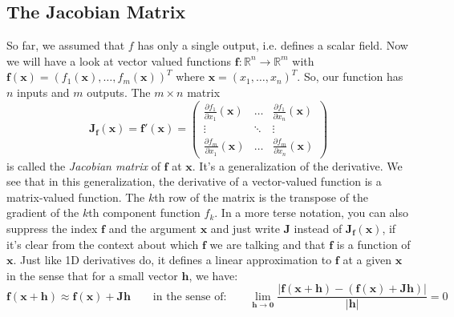 \subsection{The Jacobian Matrix}
So far, we assumed that $f$ has only a single output, i.e. defines a scalar field. Now we will have a look at vector valued functions $\mathbf{f}: \mathbb{R}^n \rightarrow \mathbb{R}^m$ with $\mathbf{f(x)} = (f_1(\mathbf{x}), \ldots, f_m(\mathbf{x}))^T$ where $\mathbf{x} = (x_1,\ldots,x_n)^T$. So, our function has $n$ inputs and $m$ outputs. The $m \times n$ matrix
\begin{equation}
 \mathbf{J_f}(\mathbf{x}) = 
 \mathbf{f'}(\mathbf{x}) = 
 \begin{pmatrix}
  \frac{\partial f_1}{\partial x_1} (\mathbf{x}) & \hdots & \frac{\partial f_1}{\partial x_n} (\mathbf{x}) \\
  \vdots & \ddots & \vdots \\
  \frac{\partial f_m}{\partial x_1} (\mathbf{x}) & \hdots & \frac{\partial f_m}{\partial x_n} (\mathbf{x})
 \end{pmatrix}
\end{equation}	
is called the \emph{Jacobian matrix} of $\mathbf{f}$ at $\mathbf{x}$. It's a generalization of the derivative. We see that in this generalization, the derivative of a vector-valued function is a matrix-valued function. The $k$th row of the matrix is the transpose of the gradient of the $k$th component function $f_k$. In a more terse notation, you can also suppress the index $\mathbf{f}$ and the argument $\mathbf{x}$ and just write $\mathbf{J}$ instead of $\mathbf{J_f}(\mathbf{x})$, if it's clear from the context about which $\mathbf{f}$ we are talking and that $\mathbf{f}$ is a function of $\mathbf{x}$. Just like 1D derivatives do, it defines a linear approximation to $\mathbf{f}$ at a given $\mathbf{x}$ in the sense that for a small vector  $\mathbf{h}$, we have:
\begin{equation}
\label{Eq:JacobianApproximation}
 \mathbf{f}(\mathbf{x + h}) \approx 
 \mathbf{f}(\mathbf{x}) + \mathbf{J  h} \qquad \text{in the sense of:}  \qquad
 \lim_{\mathbf{h \rightarrow 0}} 
 \frac{ | \mathbf{f(x+h) - (f(x) + J h)}| }{ |\mathbf{h}| } = 0 
\end{equation}	
